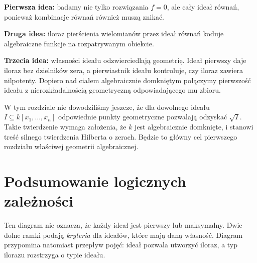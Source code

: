 \textbf{Pierwsza idea:} badamy nie tylko rozwiązania $f=0$, ale cały
ideał równań, ponieważ kombinacje równań również muszą znikać.

\textbf{Druga idea:} iloraz pierścienia wielomianów przez ideał równań
koduje algebraiczne funkcje na rozpatrywanym obiekcie.

\textbf{Trzecia idea:} własności ideału odzwierciedlają geometrię.
Ideał pierwszy daje iloraz bez dzielników zera,
a pierwiastnik ideału kontroluje, czy iloraz zawiera nilpotenty.
Dopiero nad ciałem algebraicznie domkniętym połączymy pierwszość
ideału z nierozkładalnością geometryczną odpowiadającego mu zbioru.

\begin{uwaga}
W tym rozdziale nie dowodziliśmy jeszcze, że dla dowolnego ideału
$I\subseteq k[x_1,\dots,x_n]$ odpowiednie punkty geometryczne
pozwalają odzyskać $\sqrt I$. Takie twierdzenie wymaga
założenia, że $k$ jest algebraicznie domknięte, i stanowi treść
silnego twierdzenia Hilberta o zerach. Będzie to główny cel
pierwszego rozdziału właściwej geometrii algebraicznej.
\end{uwaga}

\section{Podsumowanie logicznych zależności}

\begin{center}
\end{center}

Ten diagram nie oznacza, że każdy ideał jest pierwszy lub maksymalny.
Dwie dolne ramki podają \emph{kryteria} dla ideałów, które mają
daną własność. Diagram przypomina natomiast przepływ pojęć:
ideał pozwala utworzyć iloraz, a typ ilorazu rozstrzyga o typie ideału.

